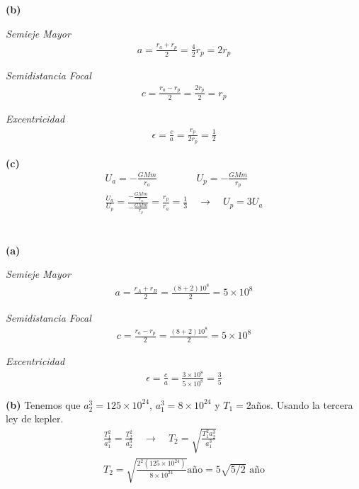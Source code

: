 \documentclass{article}
\begin{document}
\hfill 

\textbf{(b)} 

\hfill 

\textit{Semieje Mayor} 
\begin{gather*}
  a = \frac{r_a + r_p }{2 } = \frac{4 }{2} r_p = 2r_p
\end{gather*}

\textit{Semidistancia Focal }
\begin{gather*}
  c = \frac{r_a - r_p }{2 } = \frac{2r_p }{2} = r_p  
\end{gather*}

\textit{Excentricidad }
\begin{gather*}
  \epsilon = \frac{c }{a } = \frac{r_p }{2r_p } = \frac{1}{2}
\end{gather*}

\hfill 

\textbf{(c) } 
\begin{gather*}
  U_a = - \frac{GMm }{r_a } \qquad \qquad U_p = - \frac{GMm }{r_p } \\ 
  \frac{U_a }{U_p } = \frac{- \frac{GMm }{r_a }}{- \frac{GMm }{r_p }} = \frac{r_p }{r_a } = \frac{1}{3} \quad \rightarrow \quad U_p = 3 U_a
\end{gather*}



\section{}

\hfill 

\textbf{(a)}

\hfill 

\textit{Semieje Mayor} 
\begin{gather*}
  a = \frac{r_A + r_B }{2 } = \frac{(8+2)10^8 }{2} = 5\times10^8
\end{gather*}

\textit{Semidistancia Focal }
\begin{gather*}
  c = \frac{r_a - r_p }{2 } = \frac{(8+2)10^8 }{2} = 5 \times 10^8
\end{gather*}

\textit{Excentricidad }
\begin{gather*}
  \epsilon = \frac{c }{a } = \frac{3 \times 10^8 }{5 \times 10^8 } = \frac{3 }{5 }
\end{gather*}

\hfill 

\textbf{(b)} Tenemos que $ a_2^3 = 125\times 10 ^ {24 }  $, $ a_1^3 = 8 \times 10 ^ {24}  $ y $ T_1 = 2  $años. Usando la tercera ley de kepler. 
\begin{gather*}
  \frac{T_1^2 }{a_1^3 } = \frac{T_2^2 }{a_2^3 } \quad \rightarrow \quad T_2 = \sqrt{\frac{T_1^2 a_2^3 }{a_1^3 }}  \\
  T_2 = \sqrt{\frac{2^2 (125\times 10 ^ {24 })}{8 \times 10 ^ {24 }}} \text{año} = 5 \sqrt{5/2} \text{ año} 
\end{gather*}
\end{document}
